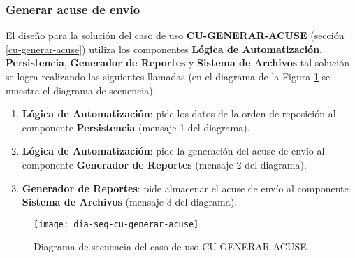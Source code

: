 \subsubsection{Generar acuse de envío}
El diseño para la solución del caso de uso \textbf{CU-GENERAR-ACUSE} (sección \ref{cu-generar-acuse}) utiliza los componentes \textbf{Lógica de Automatización}, \textbf{Persistencia}, \textbf{Generador de Reportes} y \textbf{Sistema de Archivos} tal solución se logra realizando las siguientes llamadas (en el diagrama de la Figura \ref{fig:dia-seq-cu-generar-acuse} se muestra el diagrama de secuencia):
\begin{enumerate}
	\item \textbf{Lógica de Automatización}: pide los datos de la orden de reposición al componente \textbf{Persistencia} (mensaje 1 del diagrama).
	\item \textbf{Lógica de Automatización}: pide la generación del acuse de envío al componente \textbf{Generador de Reportes} (mensaje 2 del diagrama).
	\item \textbf{Generador de Reportes}: pide almacenar el acuse de envío al componente \textbf{Sistema de Archivos} (mensaje 3 del diagrama).
\end{enumerate}

\begin{figure}[h]
	\centering
	\texttt{[image: dia-seq-cu-generar-acuse]}
	\caption{Diagrama de secuencia del caso de uso CU-GENERAR-ACUSE.}
	\label{fig:dia-seq-cu-generar-acuse}
\end{figure}


